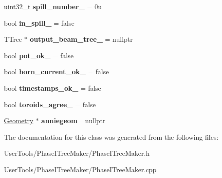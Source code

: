 \begin{DoxyCompactItemize}
\item 
\hypertarget{classPhaseITreeMaker_a9363a87ceae0d21c75e01db1df6cdd8a}{uint32\-\_\-t {\bfseries spill\-\_\-number\-\_\-} = 0u}\label{classPhaseITreeMaker_a9363a87ceae0d21c75e01db1df6cdd8a}

\item 
\hypertarget{classPhaseITreeMaker_a2abc635b4b7dd1049eb03aea068c727b}{bool {\bfseries in\-\_\-spill\-\_\-} = false}\label{classPhaseITreeMaker_a2abc635b4b7dd1049eb03aea068c727b}

\item 
\hypertarget{classPhaseITreeMaker_a6ed6473e4b74ba6eff55b1121f4bc3b1}{T\-Tree $\ast$ {\bfseries output\-\_\-beam\-\_\-tree\-\_\-} = nullptr}\label{classPhaseITreeMaker_a6ed6473e4b74ba6eff55b1121f4bc3b1}

\item 
\hypertarget{classPhaseITreeMaker_adda325293e3d77024523c447761ff3a3}{bool {\bfseries pot\-\_\-ok\-\_\-} = false}\label{classPhaseITreeMaker_adda325293e3d77024523c447761ff3a3}

\item 
\hypertarget{classPhaseITreeMaker_ad22c1f1d5f83ed60d6cb8d4b38cd1a93}{bool {\bfseries horn\-\_\-current\-\_\-ok\-\_\-} = false}\label{classPhaseITreeMaker_ad22c1f1d5f83ed60d6cb8d4b38cd1a93}

\item 
\hypertarget{classPhaseITreeMaker_ae63bf72fba04f5334a75801b207b76a5}{bool {\bfseries timestamps\-\_\-ok\-\_\-} = false}\label{classPhaseITreeMaker_ae63bf72fba04f5334a75801b207b76a5}

\item 
\hypertarget{classPhaseITreeMaker_aaefb2a68be7c1f78577db8631680304a}{bool {\bfseries toroids\-\_\-agree\-\_\-} = false}\label{classPhaseITreeMaker_aaefb2a68be7c1f78577db8631680304a}

\item 
\hypertarget{classPhaseITreeMaker_a9f95ccc126493c05a7f4ee7a3da86fe2}{\hyperlink{classGeometry}{Geometry} $\ast$ {\bfseries anniegeom} =nullptr}\label{classPhaseITreeMaker_a9f95ccc126493c05a7f4ee7a3da86fe2}

\end{DoxyCompactItemize}


The documentation for this class was generated from the following files\-:\begin{DoxyCompactItemize}
\item 
User\-Tools/\-Phase\-I\-Tree\-Maker/Phase\-I\-Tree\-Maker.\-h\item 
User\-Tools/\-Phase\-I\-Tree\-Maker/Phase\-I\-Tree\-Maker.\-cpp\end{DoxyCompactItemize}
